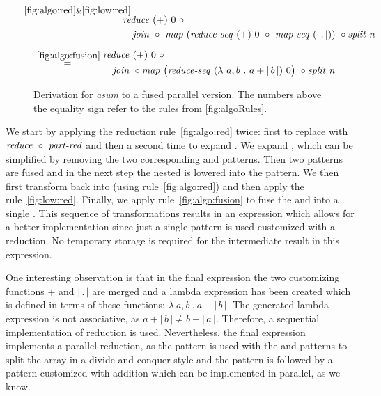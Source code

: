 \begin{figure*}[t]
\begin{align*}
\begin{aligned}
  & \overset{\hspace{-1.3em}\ref{fig:algo:red}\& \ref{fig:low:red}\hspace{-1.1em}}{=\hspace{.2em}}
      \begin{aligned}
        &\\[.5em]
        & \reduce\ (+)\ 0\ \circ\\
        &\quad \join\ \circ\ \map\ (\reduceSeq\ (+)\ 0\ \circ\ \mapSeq\ (|\, .\, |))\ \circ \splitN\ n
      \end{aligned}\\[.5em]
  & \overset{\ref{fig:algo:fusion}}{=\hspace{.2em}}
      \begin{aligned}
        & \reduce\ (+)\ 0\ \circ\\
        &\quad  \join\ \circ \map\ \big(\reduceSeq\ (\lambda\ a, b\ .\ a+|\, b\, |)\ 0\big)\ \circ \splitN\ n
      \end{aligned}
  \end{aligned}
\end{align*}
\caption[Derivation of \emph{asum} to a fused parallel version]{Derivation for \emph{asum} to a fused parallel version.
  The numbers above the equality sign refer to the rules from \autoref{fig:algoRules}.
}
\label{fig:derivation}
\end{figure*}


We start by applying the reduction rule~\ref{fig:algo:red} twice:
first to replace \reduce with $\text{\textit{reduce}}\ \circ\ \text{\textit{part-red}}$ and then a second time to expand \partRed.
We expand \map, which can be simplified by removing the two corresponding \join and \splitN patterns.
Then two \map patterns are fused and in the next step the nested \map is lowered into the \mapSeq pattern.
We then first transform \partRed back into \reduce (using rule~\ref{fig:algo:red}) and then apply the \OpenCL rule~\ref{fig:low:red}.
Finally, we apply rule~\ref{fig:algo:fusion} to fuse the \mapSeq and \reduceSeq into a single \reduceSeq.
This sequence of transformations results in an expression which allows for a better \OpenCL implementation since just a single \map pattern is used customized with a reduction.
No temporary storage is required for the intermediate result in this expression.

One interesting observation is that in the final expression the two customizing functions $+$ and $|\, .\,|$ are merged and a lambda expression has been created which is defined in terms of these functions: $\lambda\ a, b\ .\ a+|\, b\, |$.
The generated lambda expression is not associative, as $a+|\, b\, | \neq b+|\, a\, |$.
Therefore, a sequential implementation of reduction is used.
Nevertheless, the final expression implements a parallel reduction, as the \map pattern is used with the \splitN and \join patterns to split the array in a divide-and-conquer style and the \map pattern is followed by a \reduce pattern customized with addition which can be implemented in parallel, as we know.


